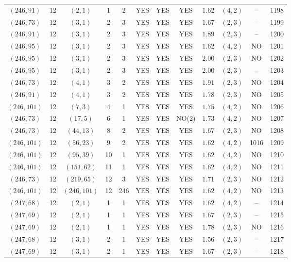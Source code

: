 \begin{longtable}{|c|c|c|c|c|c|c|c|c|c|c|c|}
$(246,91)$ & 12 & $(2,1)$ & 1 & 2 & YES & YES & YES & $1.62$ & $(4,2)$ & -- & 1198\\
$(246,73)$ & 12 & $(3,1)$ & 2 & 3 & YES & YES & YES & $1.67$ & $(2,3)$ & -- & 1199\\
$(246,91)$ & 12 & $(3,1)$ & 2 & 3 & YES & YES & YES & $1.89$ & $(2,3)$ & -- & 1200\\
$(246,95)$ & 12 & $(3,1)$ & 2 & 3 & YES & YES & YES & $1.62$ & $(4,2)$ & NO & 1201\\
$(246,95)$ & 12 & $(3,1)$ & 2 & 3 & YES & YES & YES & $2.00$ & $(2,3)$ & NO & 1202\\
$(246,95)$ & 12 & $(3,1)$ & 2 & 3 & YES & YES & YES & $2.00$ & $(2,3)$ & -- & 1203\\
$(246,73)$ & 12 & $(4,1)$ & 3 & 2 & YES & YES & YES & $1.91$ & $(2,3)$ & NO & 1204\\
$(246,91)$ & 12 & $(4,1)$ & 3 & 2 & YES & YES & YES & $1.78$ & $(2,3)$ & NO & 1205\\
$(246,101)$ & 12 & $(7,3)$ & 4 & 1 & YES & YES & YES & $1.75$ & $(4,2)$ & NO & 1206\\
$(246,73)$ & 12 & $(17,5)$ & 6 & 1 & YES & YES & NO(2) & $1.73$ & $(4,2)$ & NO & 1207\\
$(246,73)$ & 12 & $(44,13)$ & 8 & 2 & YES & YES & YES & $1.67$ & $(2,3)$ & NO & 1208\\
$(246,101)$ & 12 & $(56,23)$ & 9 & 2 & YES & YES & YES & $1.62$ & $(4,2)$ & 1016 & 1209\\
$(246,101)$ & 12 & $(95,39)$ & 10 & 1 & YES & YES & YES & $1.62$ & $(4,2)$ & NO & 1210\\
$(246,101)$ & 12 & $(151,62)$ & 11 & 1 & YES & YES & YES & $1.62$ & $(4,2)$ & NO & 1211\\
$(246,73)$ & 12 & $(219,65)$ & 12 & 3 & YES & YES & YES & $1.71$ & $(2,3)$ & NO & 1212\\
$(246,101)$ & 12 & $(246,101)$ & 12 & 246 & YES & YES & YES & $1.62$ & $(4,2)$ & NO & 1213\\
$(247,68)$ & 12 & $(2,1)$ & 1 & 1 & YES & YES & YES & $1.62$ & $(4,2)$ & -- & 1214\\
$(247,69)$ & 12 & $(2,1)$ & 1 & 1 & YES & YES & YES & $1.67$ & $(2,3)$ & -- & 1215\\
$(247,69)$ & 12 & $(2,1)$ & 1 & 1 & YES & YES & YES & $1.78$ & $(2,3)$ & NO & 1216\\
$(247,68)$ & 12 & $(3,1)$ & 2 & 1 & YES & YES & YES & $1.56$ & $(2,3)$ & -- & 1217\\
$(247,69)$ & 12 & $(3,1)$ & 2 & 1 & YES & YES & YES & $1.67$ & $(2,3)$ & -- & 1218\\

\end{longtable}
